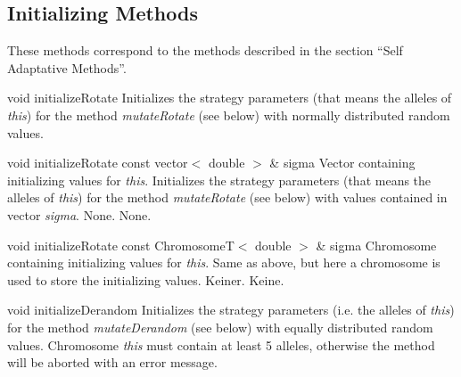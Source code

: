 \subsection{Initializing Methods}

These methods correspond to the methods described in the
section ``Self Adaptative Methods''.

\vspace*{2ex}

\setNormalInstance
\setCorrectWidthThree{8pt}
\printMethodWithParamsSaved
{void}
{}
{initializeRotate}
{Initializes the strategy parameters (that means the alleles of
 {\em this}) for the method {\em mutateRotate} (see below) with
 normally distributed random values.}
{}
\setCorrectWidthThree{4pt}

\vspace*{4ex}

\setNormalInstance
\printMethodWithOneParam
{void}
{initializeRotate}
{const vector$<$ double $>$ \&}
{sigma}
{Vector containing initializing values for {\em this}.}
{Initializes the strategy parameters (that means the alleles of
 {\em this}) for the method {\em mutateRotate} (see below) with
 values contained in vector {\em sigma}.}
{None.}
{None.}

\clearpage

\setNormalInstance
\printMethodWithOneParam
{void}
{initializeRotate}
{const ChromosomeT$<$ double $>$ \&}
{sigma}
{Chromosome containing initializing values for {\em this}.}
{Same as above, but here a chromosome is used to store the
 initializing values.}
{Keiner.}
{Keine.}

\vspace*{4ex}

\setNormalInstance
\setCorrectWidthThree{8pt}
\printMethodWithParamsSaved
{void}
{}
{initializeDerandom}
{Initializes the strategy parameters (i.e. the alleles of
 {\em this}) for the method {\em mutateDerandom} (see below) with
 equally distributed random values.}
{Chromosome {\em this} must contain at least 5 alleles, otherwise
 the method will be aborted with an error message.}
\setCorrectWidthThree{4pt}


